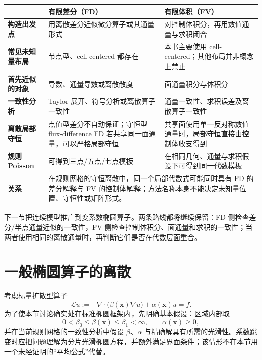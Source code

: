 \begin{center}
\small
\begin{tabularx}{0.96\textwidth}{>{\bfseries}p{2.7cm}X X}
\toprule
 & 有限差分（FD） & 有限体积（FV）\\
\midrule
构造出发点 & 用离散差分近似微分算子或其通量形式 & 对控制体积分，再用数值通量与求积闭合\\
常见未知量布局 & 节点型、cell-centered 都存在 & 本书主要使用 cell-centered；其他布局并非概念上禁止\\
首先近似的对象 & 导数、通量导数或离散散度 & 面通量积分与体积分\\
一致性分析 & Taylor 展开、符号分析或离散算子一致性 & 通量一致性、求积误差及离散算子一致性\\
离散局部守恒 & 点值型差分不自动保证；守恒型 flux-difference FD 若共享同一面通量，可以严格局部守恒 & 共享面使用单一反对称数值通量时，局部守恒直接由控制体收支得到\\
规则 Poisson & 可得到三点/五点/七点模板 & 在相同几何、通量与求积假设下可得到同一代数模板\\
关系 & \multicolumn{2}{X}{在规则网格的守恒离散中，同一个局部代数式可能同时具有 FD 的差分解释与 FV 的控制体解释；方法名称本身不能决定未知量位置、守恒性或矩阵形式。}\\
\bottomrule
\end{tabularx}
\end{center}

下一节把连续模型推广到变系数椭圆算子。两条路线都将继续保留：FD 侧检查差分/半点通量近似的一致性，FV 侧检查控制体积分、面通量和求积的一致性；当两者使用相同的离散通量时，再判断它们是否在代数层面重合。


\section{一般椭圆算子的离散}
\label{sec:discretization-general-elliptic}

考虑标量扩散型算子
\begin{equation}
\mathcal Lu
:=-\nabla\cdot\bigl(\beta(\bm x)\nabla u\bigr)
+\alpha(\bm x)u
=f.
\label{eq:discretization-general-diffusion}
\end{equation}
为了使本节讨论确实处在标准椭圆框架内，先明确基本假设：区域内部取
\begin{equation}
0<\beta_0\le \beta(\bm x)\le \beta_1<\infty,
\qquad
\alpha(\bm x)\ge0,
\label{eq:discretization-ellipticity-assumption}
\end{equation}
并在当前规则网格的一致性分析中假设 $\beta$、$\alpha$ 与精确解具有所需的光滑性。系数跳变时应把问题理解为分片光滑椭圆方程，并额外满足界面条件；该情形不在本节用一个未经证明的“平均公式”代替。

